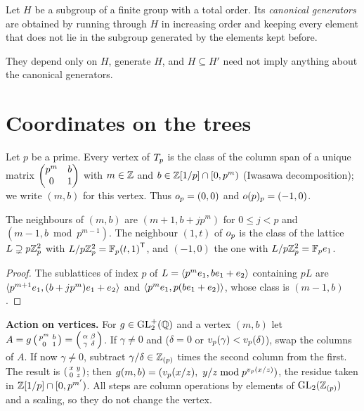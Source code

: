 \begin{definition}\label{def:canonical-generators}
Let $H$ be a subgroup of a finite group with a total order. Its
\emph{canonical generators} are obtained by running through $H$ in increasing
order and keeping every element that does not lie in the subgroup generated
by the elements kept before.
\end{definition}

They depend only on $H$, generate $H$, and $H \subseteq H'$ need not imply
anything about the canonical generators.

\section{Coordinates on the trees}

\begin{definition}\label{def:vertex-coordinates}
Let $p$ be a prime. Every vertex of $T_{p}$ is the class of the column span
of a unique matrix $\begin{pmatrix} p^m & b \\ 0 & 1 \end{pmatrix}$ with $m \in \mathbb{Z}$ and
$b \in \mathbb{Z}[1/p] \cap [0, p^m)$ (Iwasawa decomposition); we write $(m, b)$ for
this vertex. Thus $o_{p} = (0, 0)$ and
$o(p)_{p} = (-1, 0)$.
\end{definition}

\begin{lemma}[Neighbours]\label{lem:neighbours}
The neighbours of $(m, b)$ are $(m+1, b + jp^m)$ for $0 \leq j < p$ and
$(m-1, b \bmod p^{m-1})$. The neighbour $(1, t)$ of $o_{p}$ is
the class of the lattice $L \supsetneq p\mathbb{Z}_{p}^2$ with
$L/p\mathbb{Z}_{p}^2 = \mathbb{F}_{p}{(t, 1)}^{\mathsf{T}}$, and $(-1, 0)$ the one with
$L/p\mathbb{Z}_{p}^2 = \mathbb{F}_{p}e_{1}$.
\end{lemma}

\begin{proof}
The sublattices of index $p$ of $L = \langle p^me_{1}, be_{1}
+ e_{2}\rangle$ containing $pL$ are
$\langle p^{m+1}e_{1}, (b + jp^m)e_{1} + e_{2}\rangle$ and
$\langle p^me_{1}, p(be_{1} + e_{2})\rangle$, whose class is
$(m-1, b)$.
\end{proof}

\begin{procedure}
\textbf{Action on vertices.} For $g \in \mathrm{GL}_{2}^{+}(\mathbb{Q})$ and a vertex $(m, b)$
let $A = g\left(\begin{smallmatrix} p^m & b \\ 0 & 1 \end{smallmatrix}\right) = \left(\begin{smallmatrix} \alpha & \beta \\ \gamma & \delta \end{smallmatrix}\right)$.
If $\gamma \neq 0$ and ($\delta = 0$ or $v_{p}(\gamma) < v_{p}(\delta)$),
swap the columns of $A$. If now $\gamma \neq 0$, subtract $\gamma/\delta \in
\mathbb{Z}_{(p)}$ times the second column from the first. The result is
$\left(\begin{smallmatrix} x & y \\ 0 & z \end{smallmatrix}\right)$; then $g(m, b) = (v_{p}(x/z),\ y/z \bmod p^{v_{p}(x/z)})$,
the residue taken in $\mathbb{Z}[1/p] \cap [0, p^{m'})$. All steps are column
operations by elements of $\GL{2}{\ZZ_{(p)}}$ and a scaling, so they do not
change the vertex.
\end{procedure}

